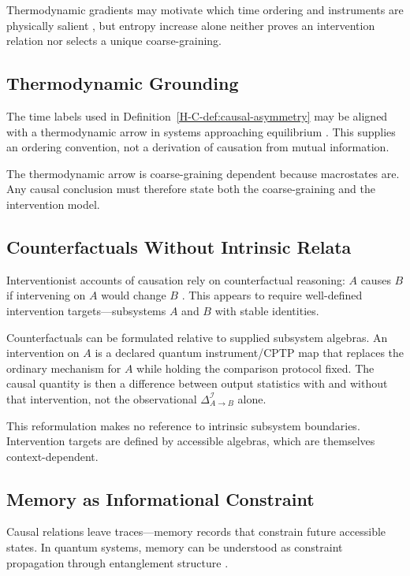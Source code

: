 \documentclass[12pt,a4paper,openany]{book}
\begin{document}
Thermodynamic gradients may motivate which time ordering and instruments are physically salient \cite{Wallace2012Time}, but entropy increase alone neither proves an intervention relation nor selects a unique coarse-graining.

\subsection{Thermodynamic Grounding}
\label{H-C-sec:I.3}

The time labels used in Definition~\ref{H-C-def:causal-asymmetry} may be aligned with a thermodynamic arrow in systems approaching equilibrium \cite{Wallace2012Time}.  This supplies an ordering convention, not a derivation of causation from mutual information.

The thermodynamic arrow is coarse-graining dependent because macrostates are.  Any causal conclusion must therefore state both the coarse-graining and the intervention model.

\subsection{Counterfactuals Without Intrinsic Relata}
\label{H-C-sec:I.4}

Interventionist accounts of causation rely on counterfactual reasoning: $A$ causes $B$ if intervening on $A$ would change $B$ \cite{Woodward2003}. This appears to require well-defined intervention targets—subsystems $A$ and $B$ with stable identities.

Counterfactuals can be formulated relative to supplied subsystem algebras.  An intervention on $A$ is a declared quantum instrument/CPTP map that replaces the ordinary mechanism for $A$ while holding the comparison protocol fixed.  The causal quantity is then a difference between output statistics with and without that intervention, not the observational $\Delta_{A\to B}^{\mathcal I}$ alone.

This reformulation makes no reference to intrinsic subsystem boundaries. Intervention targets are defined by accessible algebras, which are themselves context-dependent.

\subsection{Memory as Informational Constraint}
\label{H-C-sec:I.5}

Causal relations leave traces—memory records that constrain future accessible states. In quantum systems, memory can be understood as constraint propagation through entanglement structure \cite{Hayden2007}.
\end{document}
